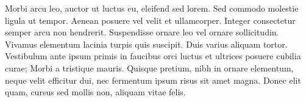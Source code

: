 \documentclass[english,aps,prd,nofootinbib,twocolumn]{revtex4-1}
\begin{document}
Morbi arcu leo, auctor ut luctus eu, eleifend sed lorem. Sed commodo molestie ligula ut tempor. Aenean posuere vel velit et ullamcorper. Integer consectetur semper arcu non hendrerit. Suspendisse ornare leo vel ornare sollicitudin. Vivamus elementum lacinia turpis quis suscipit. Duis varius aliquam tortor. Vestibulum ante ipsum primis in faucibus orci luctus et ultrices posuere cubilia curae; Morbi a tristique mauris. Quisque pretium, nibh in ornare elementum, neque velit efficitur dui, nec fermentum ipsum risus sit amet magna. Donec elit quam, cursus sed mollis non, aliquam vitae felis.
\end{document}
